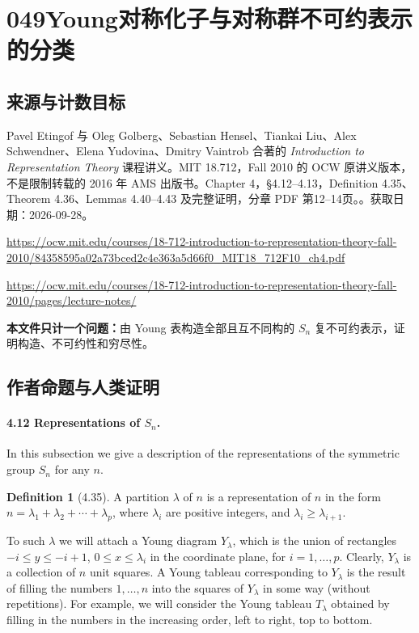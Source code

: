 \documentclass[UTF8,11pt]{ctexart}
\theoremstyle{definition}
\newtheorem*{definition}{Definition}
\begin{document}
\section*{049\quad Young对称化子与对称群不可约表示的分类}
\subsection*{来源与计数目标}
Pavel Etingof 与 Oleg Golberg、Sebastian Hensel、Tiankai Liu、Alex Schwendner、Elena Yudovina、Dmitry Vaintrob 合著的 \emph{Introduction to Representation Theory} 课程讲义。MIT 18.712，Fall 2010 的 OCW 原讲义版本，不是限制转载的 2016 年 AMS 出版书。Chapter 4，\S4.12--4.13，Definition 4.35、Theorem 4.36、Lemmas 4.40--4.43 及完整证明，分章 PDF 第12--14页。。获取日期：2026-09-28。
\par\url{https://ocw.mit.edu/courses/18-712-introduction-to-representation-theory-fall-2010/84358595a02a73bced2c4e363a5d66f0_MIT18_712F10_ch4.pdf}
\par\url{https://ocw.mit.edu/courses/18-712-introduction-to-representation-theory-fall-2010/pages/lecture-notes/}
\par\textbf{本文件只计一个问题：}由 Young 表构造全部且互不同构的 $S_n$ 复不可约表示，证明构造、不可约性和穷尽性。
\subsection*{作者命题与人类证明}

\paragraph{4.12 Representations of $S_n$.}
In this subsection we give a description of the representations of the symmetric group $S_n$ for any $n$.
\begin{definition}[4.35]
A partition $\lambda$ of $n$ is a representation of $n$ in the form $n=\lambda_1+\lambda_2+\cdots+\lambda_p$, where $\lambda_i$ are positive integers, and $\lambda_i\geq\lambda_{i+1}$.
\end{definition}
To such $\lambda$ we will attach a Young diagram $Y_\lambda$, which is the union of rectangles $-i\leq y\leq-i+1$, $0\leq x\leq\lambda_i$ in the coordinate plane, for $i=1,\ldots,p$. Clearly, $Y_\lambda$ is a collection of $n$ unit squares. A Young tableau corresponding to $Y_\lambda$ is the result of filling the numbers $1,\ldots,n$ into the squares of $Y_\lambda$ in some way (without repetitions). For example, we will consider the Young tableau $T_\lambda$ obtained by filling in the numbers in the increasing order, left to right, top to bottom.
\end{document}
